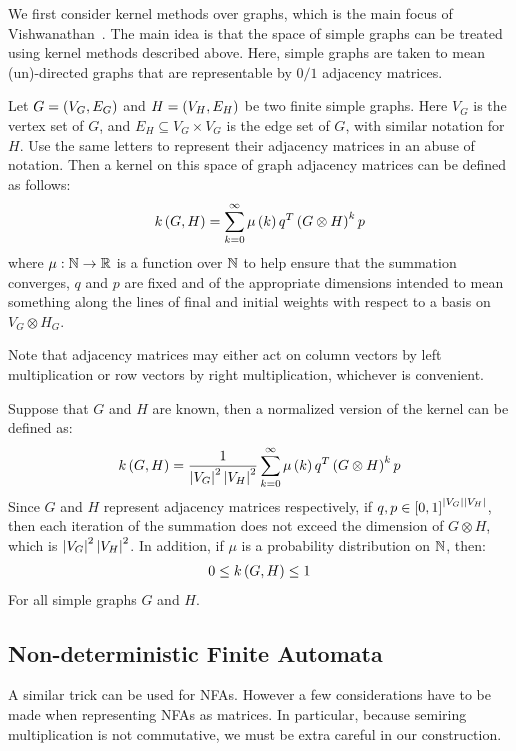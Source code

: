 \documentclass[12pt]{article}
\begin{document}
We first consider kernel methods over graphs, which is the main focus
of Vishwanathan~\cite{vishwanathan2010graph}.
The main idea is that the space of simple graphs can be treated
using kernel methods described above.
Here, simple graphs are taken to mean (un)-directed graphs
that are representable by \(0 / 1\) adjacency matrices.

Let \(G = \left(V_G, E_G\right)\) and
\(H = \left(V_H, E_H\right)\) be two finite simple graphs.
Here \(V_G\) is the vertex set of \(G\), and \(E_H \subseteq V_G \times V_G\)
is the edge set of \(G\), with similar notation for \(H\).
Use the same letters to represent their adjacency matrices in an abuse
of notation.
Then a kernel on this space of graph adjacency matrices can be
defined as follows:
\begin{align*}
  k\left(G, H\right)
    = \sum_{k = 0}^{\infty} \mu\left(k\right) q^T \left(G \otimes H\right)^k p
\end{align*}
where \(\mu : \mathbb{N} \to \mathbb{R}\) is a function over \(\mathbb{N}\)
to help ensure that the summation converges,
\(q\) and \(p\) are fixed and of the appropriate dimensions
intended to mean something along the lines of final
and initial weights with respect to a basis on \(V_G \otimes H_G\).

Note that adjacency matrices may either act on column vectors by
left multiplication or row vectors by right multiplication,
whichever is convenient.

Suppose that \(G\) and \(H\) are known,
then a normalized version of the kernel can be defined as:
\begin{align*}
  k\left(G, H\right)
    = \frac{1}{\left\lvert V_G\right\rvert^2 \left\lvert V_H\right\rvert^2}
      \sum_{k = 0}^{\infty} \mu\left(k\right) q^T \left(G \otimes H\right)^k p
\end{align*}
Since \(G\) and \(H\) represent adjacency matrices respectively,
if \(q, p \in \left[0, 1\right]^{\left\lvert V_G\right\rvert \left\lvert V_H\right\rvert}\),
then each iteration of the summation does not exceed the dimension
of \(G \otimes H\),
which is \(\left\lvert V_G\right\rvert^2 \left\lvert V_H\right\rvert^2\).
In addition, if \(\mu\) is a probability distribution on \(\mathbb{N}\), then:
\begin{align*}
  0 \leq k\left(G, H\right) \leq 1
\end{align*}
For all simple graphs \(G\) and \(H\).





\subsection{Non-deterministic Finite Automata}
A similar trick can be used for NFAs.
However a few considerations have to be made when representing NFAs
as matrices.
In particular, because semiring multiplication is not commutative,
we must be extra careful in our construction.
\end{document}
